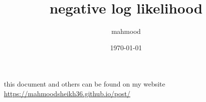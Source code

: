 \documentclass[a4paper,12pt]{article}
\author{mahmood}
\date{\today}
\title{negative log likelihood}
\begin{document}
\maketitle
\begin{note}
this document and others can be found on my website\\
\url{https://mahmoodsheikh36.github.io/post/}
\end{note}
\end{document}
